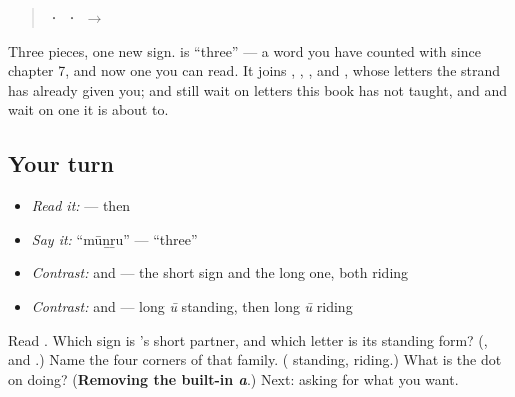 \begin{quote}
\textbf{ ·  ·  $\to$ }
\end{quote}

Three pieces, one new sign. \textbf{} is \textquotedblleft{}three\textquotedblright{} — a word you have counted with since chapter 7, and now one you can read. It joins \textbf{}, \textbf{}, \textbf{}, \textbf{} and \textbf{}, whose letters the strand has already given you; \textbf{} and \textbf{} still wait on letters this book has not taught, and \textbf{} and \textbf{} wait on one it is about to.

\subsection*{Your turn}
\begin{itemize}
\raggedright
  \item \emph{Read it:} \textbf{} — then \textbf{}
  \item \emph{Say it:} \textquotedblleft{}mūṉṟu\textquotedblright{} — \textquotedblleft{}three\textquotedblright{}
  \item \emph{Contrast:} \textbf{} and \textbf{} — the short sign and the long one, both riding
  \item \emph{Contrast:} \textbf{} and \textbf{} — long \emph{ū} standing, then long \emph{ū} riding
\end{itemize}

\begin{tcolorbox}[breakable,colback=teal!4,colframe=teal!35!black,title={Before you move on}]
Read \textbf{}. Which sign is \textbf{}'s short partner, and which letter is its standing form? (\textbf{}, and \textbf{}.) Name the four corners of that family. (\textbf{ } standing, \textbf{ } riding.) What is the dot on \textbf{} doing? (\textbf{Removing the built-in \emph{a}}.) Next: asking for what you want.
\end{tcolorbox}
